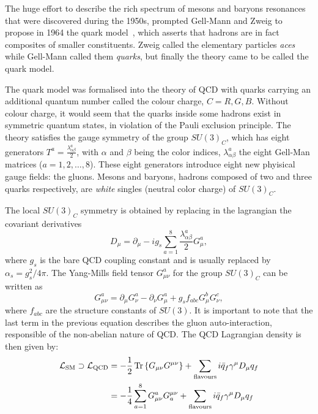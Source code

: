 The huge effort to describe the rich spectrum of mesons and baryons resonances that were discovered during the 1950s, prompted Gell-Mann and Zweig to propose in 1964 the quark model~\cite{Gellmann-1964,Zweig-1964_1,Zweig-1964_2}, which asserts that hadrons are in fact composites of smaller constituents. Zweig called the elementary particles \textit{aces} while Gell-Mann called them \textit{quarks}, but finally the theory came to be called the quark model.

The quark model was formalised into the theory of \ac{QCD} with quarks carrying an additional quantum number called the colour charge, \(C=R,G,B\). Without colour charge, it would seem that the quarks inside some hadrons exist in symmetric quantum states, in violation of the Pauli exclusion principle.
The theory satisfies the gauge symmetry of the group \(SU(3)_C\), which has eight generators \(T^a = \frac{\lambda_{\alpha\beta}^a}{2}\), with \(\alpha\) and \(\beta\) being the color indices, \(\lambda_{\alpha\beta}^a\) the eight Gell-Man matrices (\(a=1,2,\dots,8\)). These eight generators introduce eight new phyisical gauge fields: the gluons.
Mesons and baryons, hadrons composed of two and three quarks respectively, are \textit{white} singles (neutral color charge) of \(SU(3)_C\). 

The local \(SU(3)_C\) symmetry is obtained by replacing in the lagrangian the covariant derivatives
\begin{equation*}
    D_{\mu} = \partial_{\mu} - i g_s \sum_{a=1}^{8} \frac{\lambda_{\alpha\beta}^a}{2} G_{\mu}^a,
\end{equation*}
where \(g_s\) is the bare \ac{QCD} coupling constant and is usually replaced by \(\alpha_s = g_s^2 / 4\pi\). The Yang-Mills field tensor \(G_{\mu\nu}^a\) for the group \(SU(3)_C\) can be written as
\begin{equation*}
    G_{\mu\nu}^a = \partial_{\mu} G_{\nu}^a - \partial_{\nu} G_{\mu}^a + g_s f_{abc} G_{\mu}^b G_{\nu}^c,
\end{equation*}
where \(f_{abc}\) are the structure constants of \(SU(3)\). It is important to note that the last term in the previous equation describes the gluon auto-interaction, responsible of the non-abelian nature of \ac{QCD}.
The \ac{QCD} Lagrangian density is then given by:
\begin{align*}
    \mathcal{L}_{\text{SM}} \supset \mathcal{L}_{\text{QCD}}
    &=
        -\frac{1}{2} \Tr\left\{G_{\mu\nu}G^{\mu\nu}\right\}
        + 
        \sum_{\text{flavours}} i \bar{q}_f \gamma^{\mu} D_{\mu} q_f\\
    &=
        -\frac{1}{4} \sum_{a=1}^{8} G_{\mu\nu}^a G^{\mu\nu}_a
        + 
        \sum_{\text{flavours}} i \bar{q}_f \gamma^{\mu} D_{\mu} q_f
\end{align*}

